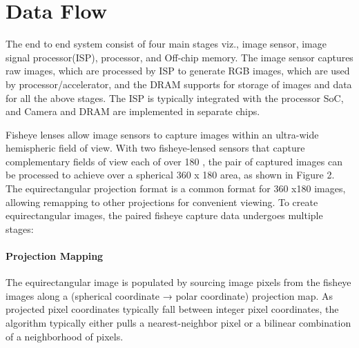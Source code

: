 \chapter{Data Flow}


The end to end system consist of four main stages viz., image sensor, image signal processor(ISP), processor, and Off-chip memory. The image sensor captures raw images, which are processed by ISP to generate RGB images, which are used by processor/accelerator, and the DRAM supports for storage of images and data for all the above stages. The ISP is typically integrated with the processor SoC, and Camera and DRAM are implemented in separate chips. 

%

Fisheye lenses allow image sensors to capture images within an ultra-wide hemispheric field of view. With two fisheye-lensed sensors that capture complementary fields of view each of over 180 \textdegree  , the pair of captured images can be processed to achieve over a spherical 360 \textdegree  x 180 \textdegree   area, as shown in Figure 2. The equirectangular projection format is a common format for 360 \textdegree  x180 \textdegree   images, allowing remapping to other projections for convenient viewing. To create equirectangular images, the paired fisheye capture data undergoes multiple stages:
\subsubsection{Projection Mapping}The equirectangular image is populated by sourcing image pixels from the fisheye images along a (spherical coordinate → polar coordinate) projection map. As projected pixel coordinates typically fall between integer pixel coordinates, the algorithm typically either pulls a nearest-neighbor pixel or a bilinear combination of a neighborhood of pixels. 
